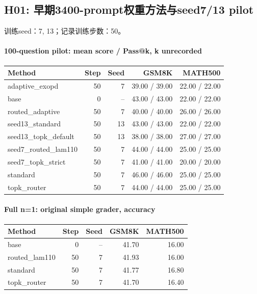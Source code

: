 \subsection{H01: 早期3400-prompt权重方法与seed7/13 pilot}
\label{history:early_weights50}
训练seed：7, 13；记录训练步数：50。
\paragraph{100-question pilot: mean score / Pass@k, k unrecorded}
{\footnotesize\setlength{\tabcolsep}{3.5pt}
\begin{longtable}{@{}p{1.4in}rrrr@{}}
\toprule
Method & Step & Seed & GSM8K & MATH500 \\
\midrule\endhead
adaptive\_\allowbreak{}exopd & 50 & 7 & 39.00 / 39.00 & 22.00 / 22.00 \\
base & 0 & -- & 43.00 / 43.00 & 22.00 / 22.00 \\
routed\_\allowbreak{}adaptive & 50 & 7 & 40.00 / 40.00 & 26.00 / 26.00 \\
seed13\_\allowbreak{}standard & 50 & 13 & 43.00 / 43.00 & 22.00 / 22.00 \\
seed13\_\allowbreak{}topk\_\allowbreak{}default & 50 & 13 & 38.00 / 38.00 & 27.00 / 27.00 \\
seed7\_\allowbreak{}routed\_\allowbreak{}lam110 & 50 & 7 & 44.00 / 44.00 & 25.00 / 25.00 \\
seed7\_\allowbreak{}topk\_\allowbreak{}strict & 50 & 7 & 41.00 / 41.00 & 20.00 / 20.00 \\
standard & 50 & 7 & 46.00 / 46.00 & 25.00 / 25.00 \\
topk\_\allowbreak{}router & 50 & 7 & 44.00 / 44.00 & 25.00 / 25.00 \\
\bottomrule\end{longtable}
}
\paragraph{Full n=1: original simple grader, accuracy}
{\footnotesize\setlength{\tabcolsep}{3.5pt}
\begin{longtable}{@{}p{1.4in}rrrr@{}}
\toprule
Method & Step & Seed & GSM8K & MATH500 \\
\midrule\endhead
base & 0 & -- & 41.70 & 16.00 \\
routed\_\allowbreak{}lam110 & 50 & 7 & 41.93 & 16.00 \\
standard & 50 & 7 & 41.77 & 16.80 \\
topk\_\allowbreak{}router & 50 & 7 & 41.70 & 16.40 \\
\bottomrule\end{longtable}
}
